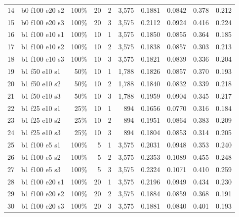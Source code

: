 \documentclass[10pt,a4paper]{article}
\begin{document}
\begin{table}[h]
\begin{tabular}{rlrrrrrrrr}
14 & b0 f100 e20 s2 & 100\% & 20 & 2 & 3,575 & 0.1881 & 0.0842 & 0.378 & 0.212\\
15 & b0 f100 e20 s3 & 100\% & 20 & 3 & 3,575 & 0.2112 & 0.0924 & 0.416 & 0.224\\
\midrule
16 & b1 f100 e10 s1 & 100\% & 10 & 1 & 3,575 & 0.1850 & 0.0855 & 0.364 & 0.185\\
17 & b1 f100 e10 s2 & 100\% & 10 & 2 & 3,575 & 0.1838 & 0.0857 & 0.303 & 0.213\\
18 & b1 f100 e10 s3 & 100\% & 10 & 3 & 3,575 & 0.1821 & 0.0839 & 0.336 & 0.204\\
19 & b1 f50 e10 s1 & 50\% & 10 & 1 & 1,788 & 0.1826 & 0.0857 & 0.370 & 0.193\\
20 & b1 f50 e10 s2 & 50\% & 10 & 2 & 1,788 & 0.1840 & 0.0832 & 0.339 & 0.218\\
21 & b1 f50 e10 s3 & 50\% & 10 & 3 & 1,788 & 0.1959 & 0.0904 & 0.345 & 0.217\\
22 & b1 f25 e10 s1 & 25\% & 10 & 1 & 894 & 0.1656 & 0.0770 & 0.316 & 0.184\\
23 & b1 f25 e10 s2 & 25\% & 10 & 2 & 894 & 0.1951 & 0.0864 & 0.383 & 0.209\\
24 & b1 f25 e10 s3 & 25\% & 10 & 3 & 894 & 0.1804 & 0.0853 & 0.314 & 0.205\\
25 & b1 f100 e5 s1 & 100\% & 5 & 1 & 3,575 & 0.2031 & 0.0948 & 0.353 & 0.240\\
26 & b1 f100 e5 s2 & 100\% & 5 & 2 & 3,575 & 0.2353 & 0.1089 & 0.455 & 0.248\\
27 & b1 f100 e5 s3 & 100\% & 5 & 3 & 3,575 & 0.2324 & 0.1071 & 0.410 & 0.259\\
28 & b1 f100 e20 s1 & 100\% & 20 & 1 & 3,575 & 0.2196 & 0.0949 & 0.434 & 0.230\\
29 & b1 f100 e20 s2 & 100\% & 20 & 2 & 3,575 & 0.1884 & 0.0859 & 0.368 & 0.191\\
30 & b1 f100 e20 s3 & 100\% & 20 & 3 & 3,575 & 0.1881 & 0.0840 & 0.401 & 0.193\\
\bottomrule\end{tabular}\end{table}
\end{document}
